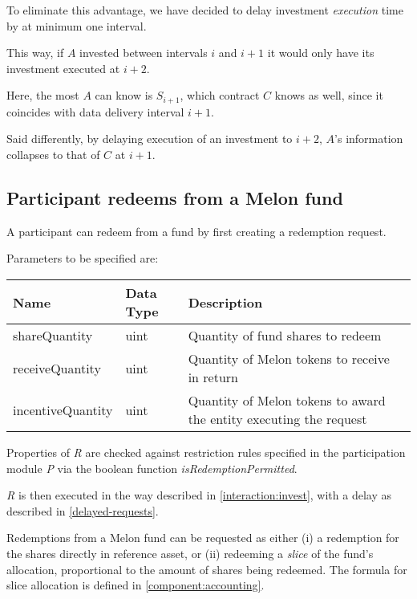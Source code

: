 \documentclass[conference]{IEEEtran}
\begin{document}
To eliminate this advantage, we have decided to delay investment \textit{execution} time by at minimum one interval.

This way, if $A$ invested between intervals $i$ and $i+1$ it would only have its investment executed at $i+2$.

Here, the most $A$ can know is $S_{i+1}$, which contract $C$ knows as well, since it coincides with data delivery interval $i+1$.

Said differently, by delaying execution of an investment to $i+2$, $A$'s information collapses to that of $C$ at $i+1$.

\subsection{Participant redeems from a Melon fund} \label{interaction:redeem}

A participant can redeem from a fund by first creating a redemption request.

Parameters to be specified are:

\begin{center}
		\footnotesize
		\begin{tabular}{ | p{2cm} | p{1.2cm} | p{4cm} | }
		\hline
		Name & Data Type & Description \\ \hline
		shareQuantity & uint & Quantity of fund shares to redeem \\ \hline
		receiveQuantity & uint & Quantity of Melon tokens to receive in return \\ \hline
		incentiveQuantity & uint & Quantity of Melon tokens to award the entity executing the request \\ \hline
	\end{tabular}
\end{center}

Properties of \textit{R} are checked against restriction rules specified in the participation module \textit{P} via the boolean function \textit{isRedemptionPermitted}.

\textit{R} is then executed in the way described in \ref{interaction:invest}, with a delay as described in \ref{delayed-requests}.

Redemptions from a Melon fund can be requested as either (i) a redemption for the shares directly in reference asset, or (ii) redeeming a \textit{slice} of the fund's allocation, proportional to the amount of shares being redeemed.
The formula for slice allocation is defined in \ref{component:accounting}.
\end{document}
